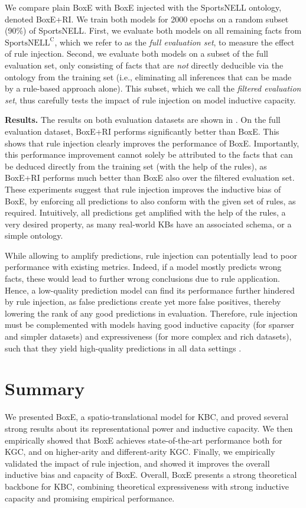 \documentclass{article}
\begin{document}
We compare plain BoxE with BoxE injected with the SportsNELL ontology, denoted BoxE+RI. We train both models for 2000 epochs on a random subset (90\%) of {SportsNELL}. First, we evaluate both models on all remaining facts from  $\text{SportsNELL}^\text{C}$, which we refer to as the \emph{full evaluation set}, to measure the effect of rule injection. 
Second, we evaluate both models on a subset of the full evaluation set, only consisting of facts that are \emph{not} directly deducible via the ontology from the training set (i.e., eliminating all inferences that can be made by a rule-based approach alone). 
This subset, which we call the \emph{filtered evaluation set},  thus carefully tests the impact of rule injection on model inductive capacity.


\textbf{Results.} The results on both evaluation datasets are shown in . On the full evaluation dataset, BoxE+RI performs significantly better than BoxE. This shows that rule injection clearly improves the performance of BoxE. Importantly, this performance improvement cannot solely be attributed to the facts that can be deduced directly from the training set (with the help of the rules), as BoxE+RI performs much better than BoxE also over the filtered evaluation set. 
These experiments suggest that rule injection improves the inductive bias of BoxE, by enforcing all predictions to also conform with the given set of rules, as required. Intuitively, all predictions get amplified with the help of the rules, a very desired property, as many real-world KBs have an associated schema, or a simple ontology. 

While allowing to amplify predictions, rule injection can potentially lead to poor performance with existing metrics. Indeed, if a model mostly predicts wrong facts, these would lead to further wrong conclusions due to rule application. Hence, a low-quality prediction model can find its performance further hindered by rule injection, as false predictions create yet more false positives, thereby lowering the rank of any good predictions in evaluation. Therefore, rule injection must be complemented with models having good inductive capacity (for sparser and simpler datasets) and expressiveness (for more complex and rich datasets), such that they yield high-quality predictions in all data settings \cite{TrouillonGDB19}.

\section{Summary}
We presented BoxE, a spatio-translational model for KBC, and proved several strong results about its representational power and inductive capacity. We then empirically showed that BoxE achieves state-of-the-art performance both for KGC, and on higher-arity and different-arity KGC. Finally, we empirically validated the impact of rule injection, and showed it improves the overall inductive bias and capacity of BoxE. Overall, BoxE presents a strong theoretical backbone for KBC, combining theoretical expressiveness with strong inductive capacity and promising empirical performance. 
\end{document}
